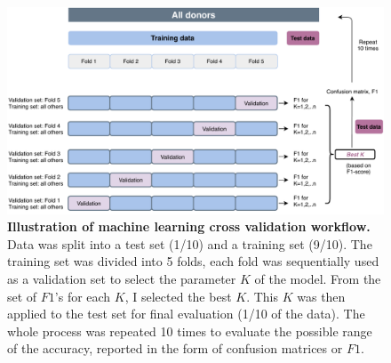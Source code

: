 \begin{figure}[h!]
    \centering
    \includegraphics[scale=0.78]{graphics/ML_demo.pdf}
    \caption{\textbf{Illustration of machine learning cross validation workflow.} Data was split into a test set (1/10) and a training set (9/10). The training set was divided into 5 folds, each fold was sequentially used as a validation set to select the parameter $K$ of the model. From the set of $F1$'s for each $K$, I selected the best $K$. This $K$ was then applied to the test set for final evaluation (1/10 of the data). The whole process was repeated 10 times to evaluate the possible range of the accuracy, reported in the form of confusion matrices or $F1$.}
    \label{fig:cv_demo}
\end{figure}
